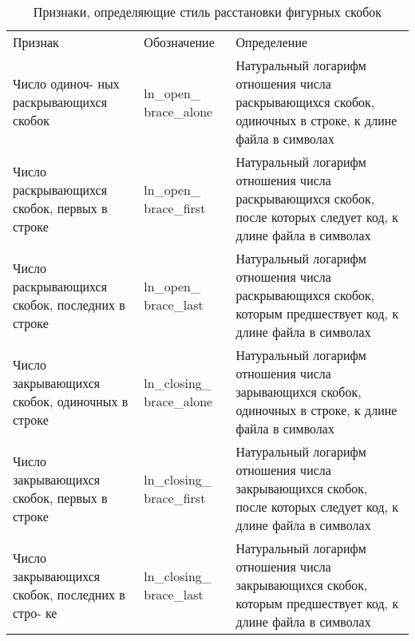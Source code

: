 \begin{table}[ht!]
\caption{ Признаки, определяющие стиль расстановки фигурных скобок }
\label{tab:lex_3}
\begin{center}
\begin{tabularx}{\linewidth}{|>{\hsize=0.23\hsize}X|>{\hsize=0.17\hsize}X|>{\hsize=0.6\hsize}X|}
\hline
\multicolumn{3}{|c|}{Стиль расстановки фигурных скобок}\\
\hline
Признак & Обозначение & Определение \\
\hline
Число одиноч- ных раскрывающихся скобок & ln\_open\_ brace\_alone & Натуральный логарифм отношения 
числа раскрывающихся скобок, одиночных в строке, к
длине файла в символах\\
\hline
Число раскрывающихся скобок, первых в строке& ln\_open\_ brace\_first& Натуральный логарифм 
отношения числа раскрывающихся скобок, после которых следует код, к длине файла в символах\\
\hline
Число раскрывающихся скобок, последних в строке & ln\_open\_ brace\_last& Натуральный логарифм 
отношения числа раскрывающихся скобок, которым предшествует код, к длине файла в символах\\
\hline
Число закрывающихся скобок, одиночных в строке & ln\_closing\_ brace\_alone& Натуральный логарифм отношения 
числа зарывающихся скобок, одиночных в строке, к длине файла в символах\\
\hline
Число закрывающихся скобок, первых в строке & ln\_closing\_ brace\_first& Натуральный логарифм 
отношения числа закрывающихся скобок, после которых следует код, к длине файла в символах\\
\hline
Число закрывающихся скобок, последних в стро- ке & ln\_closing\_ brace\_last& Натуральный логарифм отношения 
числа закрывающихся скобок, которым предшествует код, к длине файла в символах\\
\hline
\end{tabularx}
\end{center}
\end{table}

\clearpage

